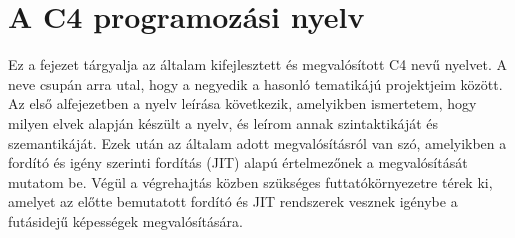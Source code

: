 \chapter{A C4 programozási nyelv}\label{chr:c4}

Ez a fejezet tárgyalja az általam kifejlesztett és megvalósított C4 nevű nyelvet.
A neve csupán arra utal, hogy a negyedik a hasonló tematikájú projektjeim között.
Az első alfejezetben a nyelv leírása következik, amelyikben ismertetem, hogy milyen elvek alapján készült a nyelv, és leírom annak szintaktikáját és szemantikáját.
Ezek után az általam adott megvalósításról van szó, amelyikben a fordító és igény szerinti fordítás (\gls{JIT}) alapú értelmezőnek a megvalósítását mutatom be.
Végül a végrehajtás közben szükséges futtatókörnyezetre térek ki, amelyet az előtte bemutatott fordító és \gls{JIT} rendszerek vesznek igénybe a futásidejű képességek megvalósítására.



